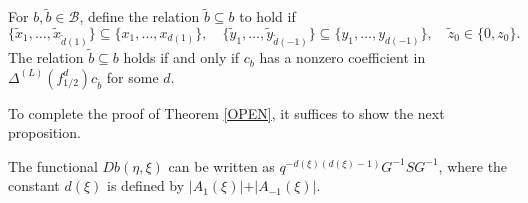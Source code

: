\documentclass[12pt]{ximera}
\begin{document}
For $b,\tilde{b} \in \mathcal{B}$, define the relation $\tilde{b} \subseteq b$ to hold if
$$
\{\tilde{x}_1,\ldots,\tilde{x}_{\tilde{d}(1)}\} \subseteq \{x_1,\ldots,x_{d(1)}\}, \quad \{\tilde{y}_1,\ldots,\tilde{y}_{\tilde{d}(-1)}\} \subseteq \{y_1,\ldots,y_{d(-1)}\}, \quad \tilde{z}_0\in \{0,z_0\}.
$$
The relation $\tilde{b}\subseteq b$ holds if and only if $c_{{b}}$ has a nonzero coefficient in $ \Delta^{(L)}(f_{1/2}^d) c_{\tilde{b}}$ for some $d$. 

To complete the proof of Theorem \ref{OPEN}, it suffices to show the next proposition.

\begin{proposition}
The functional $Db(\eta,\xi)$ can be written as $q^{ -d(\xi) (d(\xi)-1 ) }G^{-1}SG^{-1}$,
where the constant $d(\xi)$ is defined by $ \vert A_1(\xi) \vert + \vert A_{-1}(\xi)\vert$.
\end{proposition}
\end{document}
